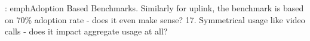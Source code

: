 : emph{Adoption Based Benchmarks.} Similarly for uplink, the benchmark is based on 70\% adoption rate - does it even make sense? 17. Symmetrical usage like video calls - does it impact aggregate usage at all?

